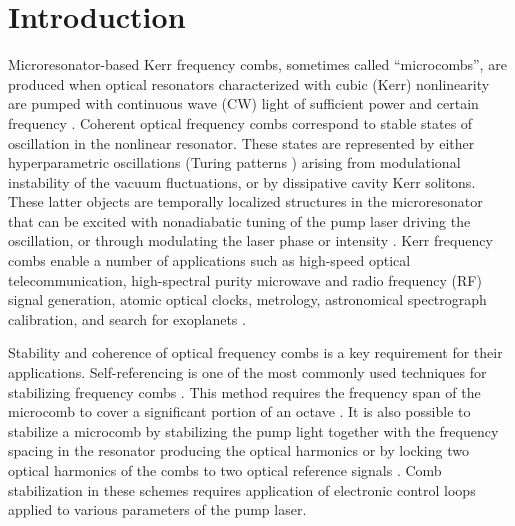 \section{Introduction}
\label{intro}
Microresonator-based Kerr frequency combs, sometimes called ``microcombs'', are produced when optical resonators characterized with cubic (Kerr) nonlinearity are pumped with continuous wave (CW) light of sufficient power and certain frequency \cite{del2007monolithic, kippenberg2011microresonatorbased, savchenkov2016nanophotonics}. Coherent optical frequency combs correspond to stable states of oscillation in the nonlinear resonator. These states are represented by either hyperparametric oscillations  \cite{matsko2005hyperparametric} (Turing patterns \cite{Coillet2013Turing}) arising from modulational instability of the vacuum fluctuations, or by dissipative cavity Kerr solitons.  These latter objects are temporally localized structures in the microresonator \cite{matsko2011modelocked, chembo2013spatiotemporal, coen2013modeling, saha2013modelocking, herr2014temporal} that can be excited with nonadiabatic tuning of the pump laser driving the oscillation, or through modulating the laser phase or intensity \cite{taheri2015soliton, jang2015writing, lobanov2016harmonization}. Kerr frequency combs enable a number of applications such as high-speed optical telecommunication, high-spectral purity microwave and radio frequency (RF) signal generation, atomic optical clocks, metrology, astronomical spectrograph calibration, and search for exoplanets \cite{pfeifle2014coherent, pfeifle2015optimally, liang2015high, savchenkov2013clock, maleki2011rubidiumclock, papp2014clock, jost2015counting, kippenberg2011microresonatorbased}.

Stability and coherence of optical frequency combs is a key requirement for their applications. Self-referencing is one of the most commonly used techniques for stabilizing frequency combs \cite{bartels2009selfref}. This method requires the frequency span of the microcomb to cover a significant portion of an octave \cite{brasch2016photonic}. It is also possible to stabilize a microcomb by stabilizing the pump light together with the frequency spacing in the resonator producing the optical harmonics \cite{Savchenkov2013stabilization} or by locking two optical harmonics of the combs to two optical reference signals \cite{delhaye2008fullstab}. Comb stabilization in these schemes requires application of electronic control loops applied to various parameters of the pump laser.


